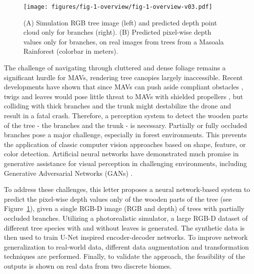 \begin{figure}[!t]
\centering
\texttt{[image: figures/fig-1-overview/fig-1-overview-v03.pdf]}
\vspace{\figurevspaceabove}
\caption{(A) Simulation RGB tree image (left) and predicted depth point cloud only for branches (right). (B) Predicted pixel-wise depth values only for branches, on real images from trees from a Masoala Rainforest (colorbar in meters).
}
\label{fig-1-overview}
\vspace{-0.6cm}
\end{figure}
The challenge of navigating through cluttered and dense foliage remains a significant hurdle for MAVs, rendering tree canopies largely inaccessible. Recent developments have shown that since MAVs can push aside compliant obstacles \cite{Aucone2023}, twigs and leaves would pose little threat to MAVs with shielded propellers \cite{Mulgaonkar2018b},
but colliding with thick branches and the trunk might destabilize the drone and result in a fatal crash. Therefore, a perception system to detect the wooden parts of the tree - the branches and the trunk - is necessary. Partially or fully occluded branches pose a major challenge, especially in forest environments. This prevents the application of classic computer vision approaches based on shape, feature, or color detection. 
Artificial neural networks have demonstrated much promise in generative assistance for visual perception in challenging environments, including  Generative Adversarial Networks (GANs) \cite{Islam2020}.

To address these challenges, this letter proposes a neural network-based system to predict the pixel-wise depth values only of the wooden parts of the tree (see Figure~\ref{fig-1-overview}), given a single RGB-D image (RGB and depth) of trees with partially occluded branches.
Utilizing a photorealistic simulator, a large RGB-D dataset of different tree species with and without leaves is generated. The synthetic data is then used to train U-Net inspired encoder-decoder networks. To improve network
generalization to real-world data, different data augmentation and transformation techniques are performed. Finally, to validate the approach, the feasibility of the outputs is shown on real data from two discrete biomes. 

